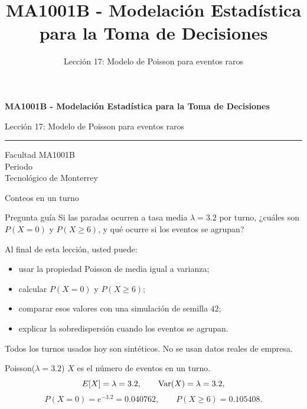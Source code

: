 \documentclass[aspectratio=169,10pt,spanish]{beamer}
\title{MA1001B - Modelación Estadística para la Toma de Decisiones}
\subtitle{Lección 17: Modelo de Poisson para eventos raros}
\author{}
\institute{Tecnol\'ogico de Monterrey}
\date{}
\begin{document}
\begin{frame}[plain]
  \vspace{1.2cm}
  {\Large\bfseries MA1001B - Modelación Estadística para la Toma de Decisiones\par}
  \vspace{0.7cm}
  {\large Lección 17: Modelo de Poisson para eventos raros\par}
  \vspace{0.7cm}
  {\color{TecRojo}\rule{\textwidth}{1.2pt}}
  \vspace{0.8cm}

  Facultad MA1001B\\[0.3cm]
  Periodo\\[0.3cm]
  Tecnol\'ogico de Monterrey
\end{frame}

\begin{frame}{Conteos en un turno}
  \begin{alertblock}{Pregunta guía}
    Si las paradas ocurren a tasa media $\lambda=3.2$ por turno, ¿cuáles son
    $P(X=0)$ y $P(X\ge 6)$, y qué ocurre si los eventos se agrupan?
  \end{alertblock}

  \vspace{0.6em}
  Al final de esta lección, usted puede:
  \begin{itemize}
    \item usar la propiedad Poisson de media igual a varianza;
    \item calcular $P(X=0)$ y $P(X\ge 6)$;
    \item comparar esos valores con una simulación de semilla $42$;
    \item explicar la sobredispersión cuando los eventos se agrupan.
  \end{itemize}

  \vfill
  \scriptsize Todos los turnos usados hoy son sintéticos. No se usan datos reales de empresa.
\end{frame}

\begin{frame}{Poisson($\lambda=3.2$)}
  \small
  $X$ es el número de eventos en un turno.
  \[
    E[X]=\lambda=3.2,\qquad \operatorname{Var}(X)=\lambda=3.2,
  \]
  \[
    P(X=0)=e^{-3.2}=0.040762,\qquad P(X\ge 6)=0.105408.
  \]
\end{frame}
\end{document}
